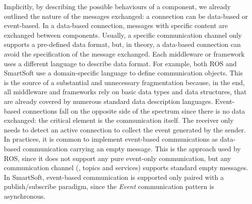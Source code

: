 Implicitly, by describing the possible behaviours of a component, we already outlined the nature of the messages exchanged: a connection can be data-based or event-based. In a data-based connection, messages with specific content are exchanged between components. Usually, a specific communication channel only supports a pre-defined data format, but, in theory, a data-based connection can avoid the specification of the message exchanged. Each middleware or framework uses a different language to describe data format. For example, both ROS  and SmartSoft use a domain-specific language to define communication objects. This is the source of a substantial and unnecessary fragmentation because, in the end, all middleware and frameworks rely on basic data types and data structures, that are already covered by numerous standard data description languages. Event-based connections fall on the opposite side of the spectrum since there is no data exchanged: the critical element is the communication itself. The receiver only needs to detect an active connection to collect the event generated by the sender. In practices, it is common to implement event-based communications as data-based communication carrying an empty message. This is the approach used by ROS, since it does not support any pure event-only communication, but any communication channel (\ie, topics and services) supports standard empty messages. In SmartSoft, event-based communication is supported only paired with a publish/subscribe paradigm, since the \textit{Event} communication pattern is asynchronous.

